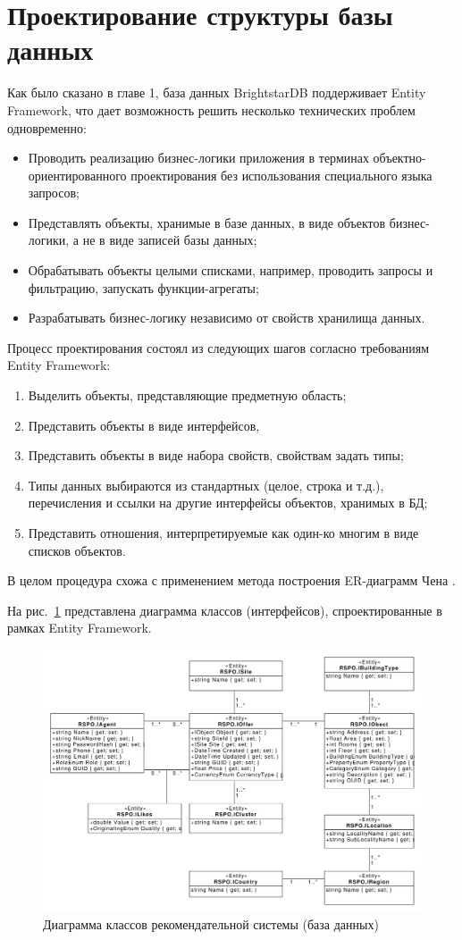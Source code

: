 \documentclass[a4paper,14pt,openany,final]{extreport} %
\def\oldcaption{} \let\oldcaption=\caption
\def\caption{\stepcounter{captionsnum}\oldcaption}
\begin{document}
\section{Проектирование структуры базы данных}

Как было сказано в главе 1, база данных BrightstarDB поддерживает Entity Framework, что дает возможность решить несколько технических проблем одновременно:
\begin{itemize}
\item Проводить реализацию бизнес-логики приложения в терминах объектно-ориентированного проектирования без использования специального языка запросов;
\item Представлять объекты, хранимые в базе данных, в виде объектов бизнес-логики, а не в виде записей базы данных;
\item Обрабатывать объекты целыми списками, например, проводить запросы и фильтрацию, запускать функции-агрегаты;
\item Разрабатывать бизнес-логику независимо от свойств хранилища данных.
\end{itemize}

Процесс проектирования состоял из следующих шагов согласно требованиям Entity Framework:
\begin{enumerate}
\item Выделить объекты, представляющие предметную область;
\item Представить объекты в виде интерфейсов,
\item Представить объекты в виде набора свойств, свойствам задать типы;
\item Типы данных выбираются из стандартных (целое, строка и т.д.), перечисления и ссылки на другие интерфейсы объектов, хранимых в БД;
\item Представить отношения, интерпретируемые как один-ко многим в виде списков объектов.
\end{enumerate}
В целом процедура схожа с применением метода построения ER-диаграмм Чена \cite{erdiagrams}.

На рис.~\ref{fig:classdiagram} представлена диаграмма классов (интерфейсов), спроектированные в рамках Entity Framework.

\begin{figure}[htbp]
  \centering
  \includegraphics[width=0.9\linewidth]{class_diagram.pdf}
  \caption{Диаграмма классов рекомендательной системы (база данных)}
  \label{fig:classdiagram}
\end{figure}
\end{document}
